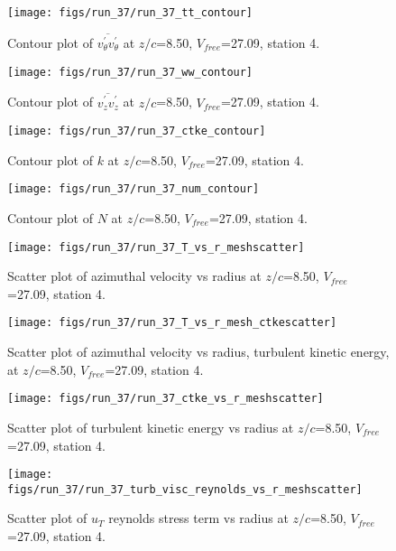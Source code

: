 \begin{figure}[H]
\centering
\texttt{[image: figs/run\_37/run\_37\_tt\_contour]}
\caption{Contour plot of $\overline{v_{\theta}^{\prime} v_{\theta}^{\prime}}$ at $z/c$=8.50, $V_{free}$=27.09, station 4.}
\end{figure}


\begin{figure}[H]
\centering
\texttt{[image: figs/run\_37/run\_37\_ww\_contour]}
\caption{Contour plot of $\overline{v_{z}^{\prime} v_{z}^{\prime}}$ at $z/c$=8.50, $V_{free}$=27.09, station 4.}
\end{figure}


\begin{figure}[H]
\centering
\texttt{[image: figs/run\_37/run\_37\_ctke\_contour]}
\caption{Contour plot of $k$ at $z/c$=8.50, $V_{free}$=27.09, station 4.}
\end{figure}


\begin{figure}[H]
\centering
\texttt{[image: figs/run\_37/run\_37\_num\_contour]}
\caption{Contour plot of $N$ at $z/c$=8.50, $V_{free}$=27.09, station 4.}
\end{figure}


\begin{figure}[H]
\centering
\texttt{[image: figs/run\_37/run\_37\_T\_vs\_r\_meshscatter]}
\caption{Scatter plot of azimuthal velocity vs radius at $z/c$=8.50, $V_{free}$=27.09, station 4.}
\end{figure}


\begin{figure}[H]
\centering
\texttt{[image: figs/run\_37/run\_37\_T\_vs\_r\_mesh\_ctkescatter]}
\caption{Scatter plot of azimuthal velocity vs radius, turbulent kinetic energy, at $z/c$=8.50, $V_{free}$=27.09, station 4.}
\end{figure}


\begin{figure}[H]
\centering
\texttt{[image: figs/run\_37/run\_37\_ctke\_vs\_r\_meshscatter]}
\caption{Scatter plot of turbulent kinetic energy vs radius at $z/c$=8.50, $V_{free}$=27.09, station 4.}
\end{figure}


\begin{figure}[H]
\centering
\texttt{[image: figs/run\_37/run\_37\_turb\_visc\_reynolds\_vs\_r\_meshscatter]}
\caption{Scatter plot of $
u_T$ reynolds stress term vs radius at $z/c$=8.50, $V_{free}$=27.09, station 4.}
\end{figure}


